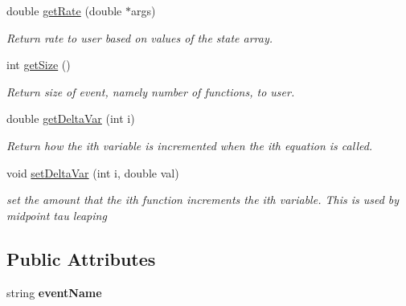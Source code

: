 \begin{DoxyCompactItemize}
double \hyperlink{class_event_a2288e3b3fa19e076e04bba11b88d189a}{get\+Rate} (double $\ast$args)
\begin{DoxyCompactList}\small\item\em Return rate to user based on values of the state array. \end{DoxyCompactList}\item 
int \hyperlink{class_event_a1a0f2e2dc0b203f7be0f1d5b8810c6a2}{get\+Size} ()
\begin{DoxyCompactList}\small\item\em Return size of event, namely number of functions, to user. \end{DoxyCompactList}\item 
double \hyperlink{class_event_afb753b1954fd16e7ba92ae16157f70fd}{get\+Delta\+Var} (int i)
\begin{DoxyCompactList}\small\item\em Return how the ith variable is incremented when the ith equation is called. \end{DoxyCompactList}\item 
void \hyperlink{class_event_a980f39895f2afc1c2273d921d92aeac0}{set\+Delta\+Var} (int i, double val)
\begin{DoxyCompactList}\small\item\em set the amount that the ith function increments the ith variable. This is used by midpoint tau leaping \end{DoxyCompactList}\end{DoxyCompactItemize}
\subsection*{Public Attributes}
\begin{DoxyCompactItemize}
\item 
\mbox{\label{class_event_acf8fc6215a0eeaa049e2aca9a347f4b0}} 
string {\bfseries event\+Name}
\end{DoxyCompactItemize}
